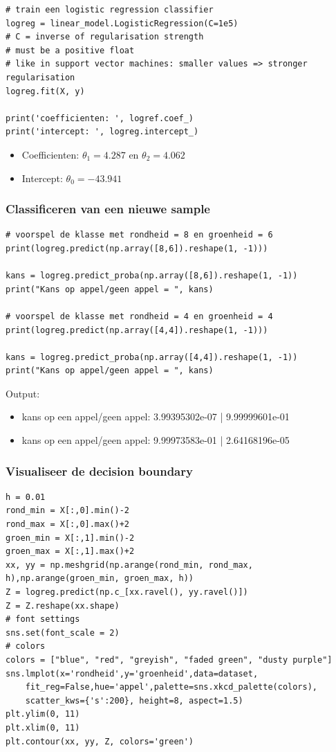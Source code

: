 \documentclass{article}
\begin{document}
\begin{verbatim}
# train een logistic regression classifier
logreg = linear_model.LogisticRegression(C=1e5)
# C = inverse of regularisation strength
# must be a positive float
# like in support vector machines: smaller values => stronger regularisation
logreg.fit(X, y)

print('coefficienten: ', logref.coef_)
print('intercept: ', logreg.intercept_)

\end{verbatim}

\begin{itemize}
    \item Coefficienten: $\theta_1 = 4.287$ en $\theta_2 = 4.062$
    \item Intercept: $\theta_0 = -43.941$
\end{itemize}

\subsubsection{Classificeren van een nieuwe sample}

\begin{verbatim}
# voorspel de klasse met rondheid = 8 en groenheid = 6
print(logreg.predict(np.array([8,6]).reshape(1, -1)))

kans = logreg.predict_proba(np.array([8,6]).reshape(1, -1))
print("Kans op appel/geen appel = ", kans)

# voorspel de klasse met rondheid = 4 en groenheid = 4
print(logreg.predict(np.array([4,4]).reshape(1, -1)))

kans = logreg.predict_proba(np.array([4,4]).reshape(1, -1))
print("Kans op appel/geen appel = ", kans)
\end{verbatim}

Output:

\begin{itemize}
    \item kans op een appel/geen appel: 3.99395302e-07 | 9.99999601e-01
    \item kans op een appel/geen appel: 9.99973583e-01 | 2.64168196e-05
\end{itemize}

\subsubsection{Visualiseer de decision boundary}

\begin{verbatim}
h = 0.01
rond_min = X[:,0].min()-2
rond_max = X[:,0].max()+2
groen_min = X[:,1].min()-2
groen_max = X[:,1].max()+2
xx, yy = np.meshgrid(np.arange(rond_min, rond_max, h),np.arange(groen_min, groen_max, h))
Z = logreg.predict(np.c_[xx.ravel(), yy.ravel()])
Z = Z.reshape(xx.shape)
# font settings
sns.set(font_scale = 2)
# colors
colors = ["blue", "red", "greyish", "faded green", "dusty purple"]
sns.lmplot(x='rondheid',y='groenheid',data=dataset,
    fit_reg=False,hue='appel',palette=sns.xkcd_palette(colors),
    scatter_kws={'s':200}, height=8, aspect=1.5)
plt.ylim(0, 11)
plt.xlim(0, 11)
plt.contour(xx, yy, Z, colors='green')
\end{verbatim}
\end{document}
